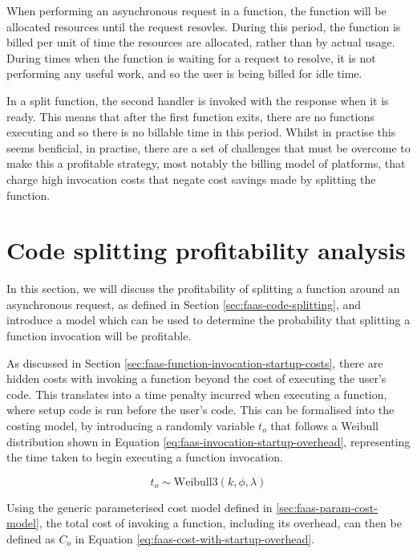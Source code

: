 When performing an asynchronous request in a function, the function will be allocated resources until the request resovles. During this period, the function is billed per unit of time the resources are allocated, rather than by actual usage. During times when the function is waiting for a request to resolve, it is not performing any useful work, and so the user is being billed for idle time.

In a split function, the second handler is invoked with the response when it is ready. This means that after the first function exits, there are no functions executing and so there is no billable time in this period. Whilst in practise this seems benficial, in practise, there are a set of challenges that must be overcome to make this a profitable strategy, most notably the billing model of \faas{} platforms, that charge high invocation costs that negate cost savings made by splitting the function.

\section{Code splitting profitability analysis}
\label{sec:faas-code-splitting-profitability}
In this section, we will discuss the profitability of splitting a function around an asynchronous request, as defined in Section \ref{sec:faas-code-splitting}, and introduce a model which can be used to determine the probability that splitting a function invocation will be profitable.

As discussed in Section \ref{sec:faas-function-invocation-startup-costs}, there are hidden costs with invoking a function beyond the cost of executing the user's code. This translates into a time penalty incurred when executing a function, where setup code is run before the user's code. This can be formalised into the costing model, by introducing a randomly variable $t_o$ that follows a Weibull distribution shown in Equation \ref{eq:faas-invocation-startup-overhead}, representing the time taken to begin executing a function invocation.

\begin{equation}
\label{eq:faas-invocation-startup-overhead}
t_o \sim \text{Weibull3}(k, \phi, \lambda)
\end{equation}

Using the generic parameterised cost model defined in \ref{sec:faas-param-cost-model}, the total cost of invoking a function, including its overhead, can then be defined as $C_o$ in Equation \ref{eq:faas-cost-with-startup-overhead}.

